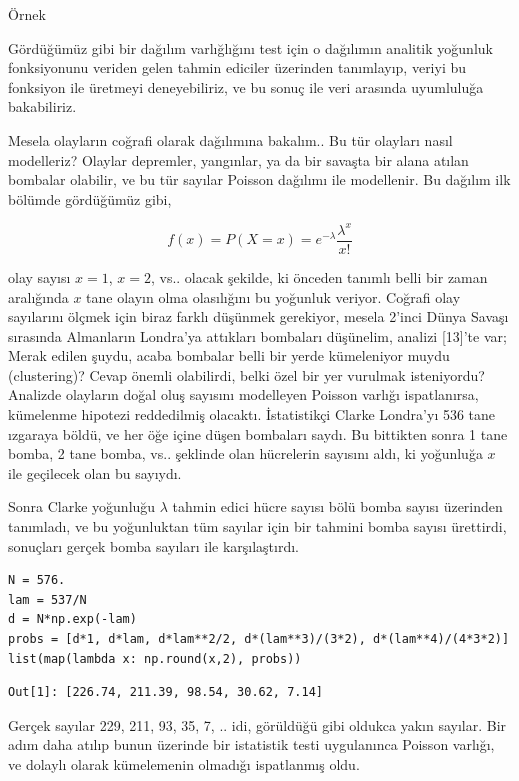 \documentclass[12pt,fleqn]{article}\usepackage{../../common}
\begin{document}
Örnek

Gördüğümüz gibi bir dağılım varlığlığını test için o dağılımın analitik yoğunluk
fonksiyonunu veriden gelen tahmin ediciler üzerinden tanımlayıp, veriyi bu
fonksiyon ile üretmeyi deneyebiliriz, ve bu sonuç ile veri arasında uyumluluğa
bakabiliriz.

Mesela olayların coğrafi olarak dağılımına bakalım..  Bu tür olayları nasıl
modelleriz? Olaylar depremler, yangınlar, ya da bir savaşta bir alana atılan
bombalar olabilir, ve bu tür sayılar Poisson dağılımı ile modellenir. Bu dağılım
ilk bölümde gördüğümüz gibi,

$$ f(x) = P(X=x) = e^{-\lambda}\frac{\lambda^{x}}{x!} $$

olay sayısı $x=1$, $x=2$, vs.. olacak şekilde, ki önceden tanımlı belli bir
zaman aralığında $x$ tane olayın olma olasılığını bu yoğunluk veriyor. Coğrafi
olay sayılarını ölçmek için biraz farklı düşünmek gerekiyor, mesela 2'inci Dünya
Savaşı sırasında Almanların Londra'ya attıkları bombaları düşünelim, analizi
[13]'te var; Merak edilen şuydu, acaba bombalar belli bir yerde kümeleniyor
muydu (clustering)? Cevap önemli olabilirdi, belki özel bir yer vurulmak
isteniyordu? Analizde olayların doğal oluş sayısını modelleyen Poisson varlığı
ispatlanırsa, kümelenme hipotezi reddedilmiş olacaktı. İstatistikçi Clarke
Londra'yı 536 tane ızgaraya böldü, ve her öğe içine düşen bombaları saydı. Bu
bittikten sonra 1 tane bomba, 2 tane bomba, vs.. şeklinde olan hücrelerin
sayısını aldı, ki yoğunluğa $x$ ile geçilecek olan bu sayıydı.

Sonra Clarke yoğunluğu $\lambda$ tahmin edici hücre sayısı bölü bomba sayısı
üzerinden tanımladı, ve bu yoğunluktan tüm sayılar için bir tahmini bomba
sayısı ürettirdi, sonuçları gerçek bomba sayıları ile karşılaştırdı.

\begin{verbatim}
N = 576.
lam = 537/N
d = N*np.exp(-lam)
probs = [d*1, d*lam, d*lam**2/2, d*(lam**3)/(3*2), d*(lam**4)/(4*3*2)]
list(map(lambda x: np.round(x,2), probs))
\end{verbatim}

\begin{verbatim}
Out[1]: [226.74, 211.39, 98.54, 30.62, 7.14]
\end{verbatim}

Gerçek sayılar 229, 211, 93, 35, 7, .. idi, görüldüğü gibi oldukca yakın
sayılar. Bir adım daha atılıp bunun üzerinde bir istatistik testi
uygulanınca Poisson varlığı, ve dolaylı olarak kümelemenin olmadığı ispatlanmış
oldu.
\end{document}
